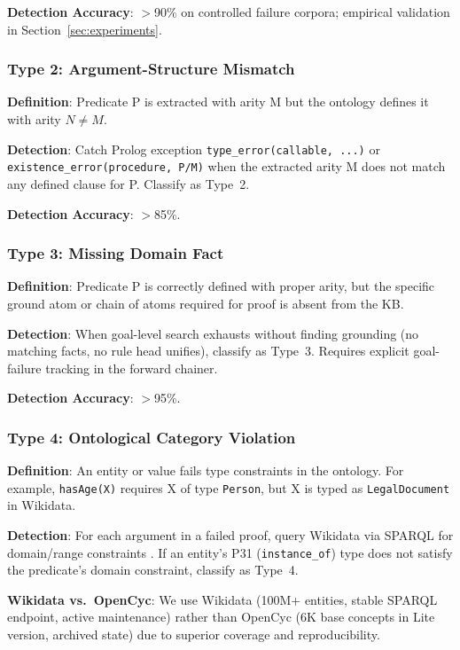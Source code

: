 \documentclass[11pt,letterpaper]{article}
\begin{document}
\textbf{Detection Accuracy}: $>$90\% on controlled failure corpora; empirical validation in Section~\ref{sec:experiments}.

\subsubsection{Type 2: Argument-Structure Mismatch}

\textbf{Definition}: Predicate P is extracted with arity M but the ontology defines it with arity $N \neq M$.

\textbf{Detection}: Catch Prolog exception \texttt{type\_error(callable, ...)} or \texttt{existence\_error(procedure, P/M)} when the extracted arity M does not match any defined clause for P. Classify as Type~2.

\textbf{Detection Accuracy}: $>$85\%.

\subsubsection{Type 3: Missing Domain Fact}

\textbf{Definition}: Predicate P is correctly defined with proper arity, but the specific ground atom or chain of atoms required for proof is absent from the KB.

\textbf{Detection}: When goal-level search exhausts without finding grounding (no matching facts, no rule head unifies), classify as Type~3. Requires explicit goal-failure tracking in the forward chainer.

\textbf{Detection Accuracy}: $>$95\%.

\subsubsection{Type 4: Ontological Category Violation}

\textbf{Definition}: An entity or value fails type constraints in the ontology. For example, \texttt{hasAge(X)} requires X of type \texttt{Person}, but X is typed as \texttt{LegalDocument} in Wikidata.

\textbf{Detection}: For each argument in a failed proof, query Wikidata via SPARQL for domain/range constraints \citep{Vrandecic2014}. If an entity's P31 (\texttt{instance\_of}) type does not satisfy the predicate's domain constraint, classify as Type~4.

\textbf{Wikidata vs.\ OpenCyc}: We use Wikidata (100M+ entities, stable SPARQL endpoint, active maintenance) rather than OpenCyc (6K base concepts in Lite version, archived state) due to superior coverage and reproducibility.
\end{document}
